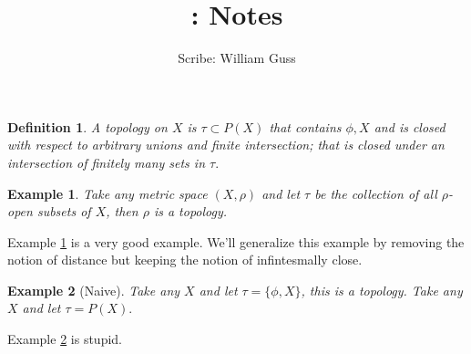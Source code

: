 \documentclass[letter]{article}
\title{\bCLASS: Notes }
\author{Scribe: William Guss}
\newtheorem{example}{Example}
\newtheorem{definition}{Definition}
\begin{document}
\maketitle
\begin{definition}
	A topology on $X$ is $\tau \subset P(X)$ that contains $\phi, X$ and
	is closed with respect to arbitrary unions and finite intersection; 
	that is closed under an intersection of finitely many sets in $\tau.$
\end{definition}

\begin{example}\label{good}
	Take any metric space $(X ,\rho)$ and let $\tau$ be the collection of all $\rho$-open subsets of $X$, 
	then $\rho$ is a topology. 
\end{example}
 Example \ref{good} is a very good example. We'll generalize this example by removing the notion of distance but keeping the notion of infintesmally close.

 \begin{example}[Naive]\label{stupid}
 Take any $X$ and let $\tau =\{\phi, X\}$, this is a topology. Take any $X$ and let $\tau = P(X).$
 \end{example}
Example \ref{stupid} is stupid.
\end{document}
